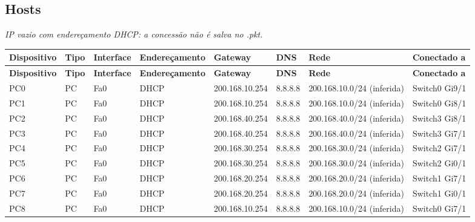 \subsection{Hosts}
\noindent\textit{IP vazio com endereçamento DHCP: a concessão não é salva no .pkt.}\par\smallskip
\begingroup\scriptsize\setlength{\tabcolsep}{3pt}
\begin{longtable}{@{}p{}p{}p{}p{}p{}p{}p{}p{}@{}}
\toprule \textbf{Dispositivo} & \textbf{Tipo} & \textbf{Interface} & \textbf{Endereçamento} & \textbf{Gateway} & \textbf{DNS} & \textbf{Rede} & \textbf{Conectado a} \\\midrule\endfirsthead
\toprule \textbf{Dispositivo} & \textbf{Tipo} & \textbf{Interface} & \textbf{Endereçamento} & \textbf{Gateway} & \textbf{DNS} & \textbf{Rede} & \textbf{Conectado a} \\\midrule\endhead
PC0 & PC & Fa0 & DHCP & 200.168.10.254 & 8.8.8.8 & 200.168.10.0/24 (inferida) & Switch0 Gi9/1 \\
PC1 & PC & Fa0 & DHCP & 200.168.10.254 & 8.8.8.8 & 200.168.10.0/24 (inferida) & Switch0 Gi8/1 \\
PC2 & PC & Fa0 & DHCP & 200.168.40.254 & 8.8.8.8 & 200.168.40.0/24 (inferida) & Switch3 Gi8/1 \\
PC3 & PC & Fa0 & DHCP & 200.168.40.254 & 8.8.8.8 & 200.168.40.0/24 (inferida) & Switch3 Gi7/1 \\
PC4 & PC & Fa0 & DHCP & 200.168.30.254 & 8.8.8.8 & 200.168.30.0/24 (inferida) & Switch2 Gi7/1 \\
PC5 & PC & Fa0 & DHCP & 200.168.30.254 & 8.8.8.8 & 200.168.30.0/24 (inferida) & Switch2 Gi0/1 \\
PC6 & PC & Fa0 & DHCP & 200.168.20.254 & 8.8.8.8 & 200.168.20.0/24 (inferida) & Switch1 Gi7/1 \\
PC7 & PC & Fa0 & DHCP & 200.168.20.254 & 8.8.8.8 & 200.168.20.0/24 (inferida) & Switch1 Gi0/1 \\
PC8 & PC & Fa0 & DHCP & 200.168.10.254 & 8.8.8.8 & 200.168.10.0/24 (inferida) & Switch0 Gi7/1 \\
\bottomrule
\end{longtable}\endgroup

